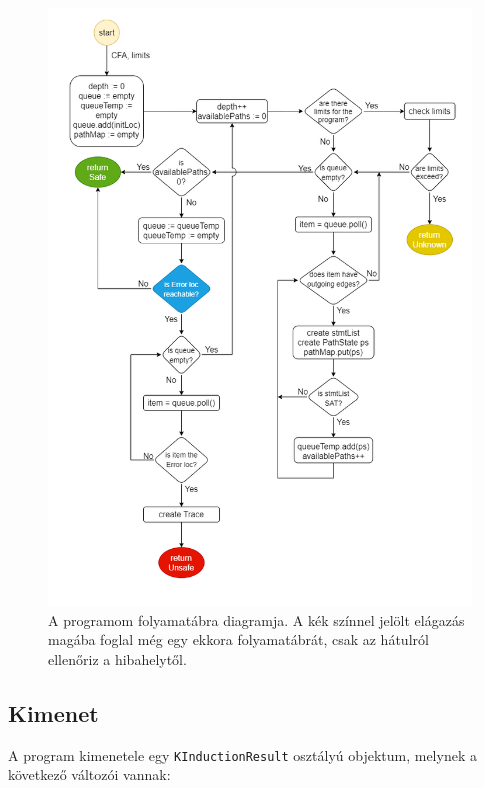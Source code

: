 \begin{figure}[!ht]
	\centering
	\includegraphics[width=150mm, keepaspectratio]{figures/flow_chart_med_res.png}
	\caption[Caption for LOF]{A programom folyamatábra diagramja. A kék színnel jelölt elágazás magába foglal még egy ekkora folyamatábrát, csak az hátulról ellenőriz a hibahelytől.}
	\label{fig:state_diagram2}
\end{figure}
\clearpage

\subsection{Kimenet}
A program kimenetele egy \verb+KInductionResult+ osztályú objektum, melynek a következő változói vannak:

